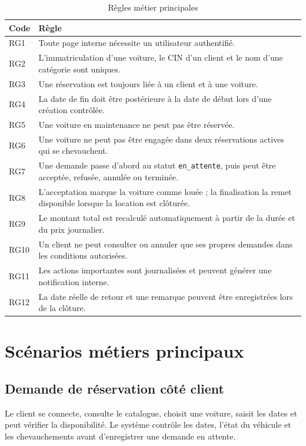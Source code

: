 \begin{table}[H]
\centering
\caption{Règles métier principales}
\begin{tabularx}{\textwidth}{|l|X|}
\hline
\textbf{Code} & \textbf{Règle} \\
\hline
RG1 & Toute page interne nécessite un utilisateur authentifié. \\
\hline
RG2 & L'immatriculation d'une voiture, le CIN d'un client et le nom d'une catégorie sont uniques. \\
\hline
RG3 & Une réservation est toujours liée à un client et à une voiture. \\
\hline
RG4 & La date de fin doit être postérieure à la date de début lors d'une création contrôlée. \\
\hline
RG5 & Une voiture en maintenance ne peut pas être réservée. \\
\hline
RG6 & Une voiture ne peut pas être engagée dans deux réservations actives qui se chevauchent. \\
\hline
RG7 & Une demande passe d'abord au statut \texttt{en\_attente}, puis peut être acceptée, refusée, annulée ou terminée. \\
\hline
RG8 & L'acceptation marque la voiture comme louée ; la finalisation la remet disponible lorsque la location est clôturée. \\
\hline
RG9 & Le montant total est recalculé automatiquement à partir de la durée et du prix journalier. \\
\hline
RG10 & Un client ne peut consulter ou annuler que ses propres demandes dans les conditions autorisées. \\
\hline
RG11 & Les actions importantes sont journalisées et peuvent générer une notification interne. \\
\hline
RG12 & La date réelle de retour et une remarque peuvent être enregistrées lors de la clôture. \\
\hline
\end{tabularx}
\end{table}

\section{Scénarios métiers principaux}

\subsection{Demande de réservation côté client}
Le client se connecte, consulte le catalogue, choisit une voiture, saisit les dates et peut vérifier la disponibilité. Le système contrôle les dates, l'état du véhicule et les chevauchements avant d'enregistrer une demande en attente.

